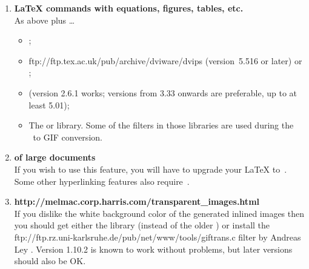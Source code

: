 \begin{enumerate}
%
%
%
\item
\textbf{\LaTeX{}  commands with equations, figures, tables, etc.} \\
As above plus \dots
%
\begin{itemize}
\item {};
%
\item
{}
{ftp://ftp.tex.ac.uk/pub/archive/dviware/dvips}
(version~5.516 or later) or ;
%
\item
{}  (version 2.6.1 works;
versions from 3.33 onwards are preferable, up to at least 5.01);
%
%
%
\item
The 
or  library.
Some of the filters in those libraries are used during the \PS\ to
GIF conversion.
\end{itemize}


%
%
\item
\textbf{ of large documents}\\
If you wish to use this feature, you will have to upgrade your
\LaTeX{} to \LaTeXe\,.
Some other hyperlinking features also require \LaTeXe\,.

%
%
\item
\textbf{%
{http://melmac.corp.harris.com/transparent\_images.html}}\\
If you dislike the white background color of the
generated inlined images then you should get either
the  library (instead of the older )
or install the %
{ftp://ftp.rz.uni-karlsruhe.de/pub/net/www/tools/giftrans.c}
filter by Andreas Ley .
Version 1.10.2 is known to work without problems,
but later versions should also be OK.
%
\end{enumerate}

%

